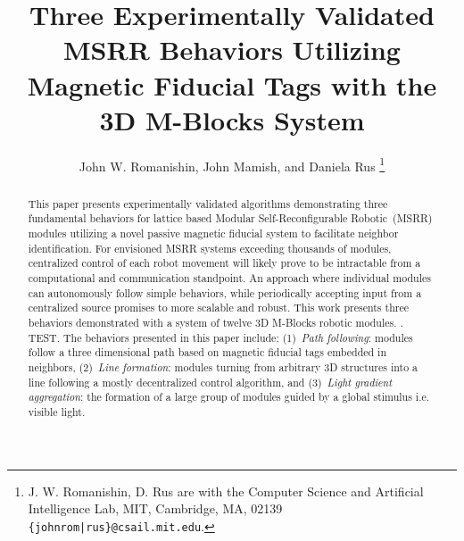 \documentclass[letterpaper, 10 pt, conference]{ieeeconf}
\title{Three Experimentally Validated MSRR Behaviors Utilizing Magnetic Fiducial Tags with the 3D M-Blocks System}
\author{John W. Romanishin, John Mamish, and Daniela Rus
  \thanks{J. W. Romanishin, D. Rus are with the Computer Science
    and Artificial Intelligence Lab, MIT, Cambridge, MA, 02139
    {\tt\small \{johnrom|rus\}@csail.mit.edu}.}
}
\begin{document}
	
\newcommand{\tagName}{MFTag}
\newcommand{\TagName}{MFTag}
\newcommand{\tagNamePlural}{MFTags}
\newcommand{\TagNamePlural}{MFTags}


\captionsetup[figure]{labelfont=small, textfont=small}
\captionsetup[table]{labelfont=small, textfont=small}

\maketitle
\thispagestyle{empty}
\pagestyle{empty}

\begin{abstract}

This paper presents experimentally validated algorithms demonstrating three fundamental behaviors for lattice based Modular Self-Reconfigurable Robotic~(MSRR) modules utilizing a novel passive magnetic fiducial system to facilitate neighbor identification. For envisioned MSRR systems exceeding thousands of modules, centralized control of each robot movement will likely prove to be intractable from a computational and communication standpoint. An approach where individual modules can autonomously follow simple behaviors, while periodically accepting input from a centralized source promises to more scalable and robust. This work presents three behaviors demonstrated with a system of twelve 3D M-Blocks robotic modules. . TEST. The behaviors presented in this paper include: (1)~\textit{Path following}: modules follow a three dimensional path based on magnetic fiducial tags embedded in neighbors, (2)~\textit{Line formation}: modules turning from arbitrary 3D structures into a line following a mostly decentralized control algorithm, and (3)~\textit{Light gradient aggregation}: the formation of a large group of modules guided by a global stimulus i.e. visible light.

\end{abstract}
\end{document}
